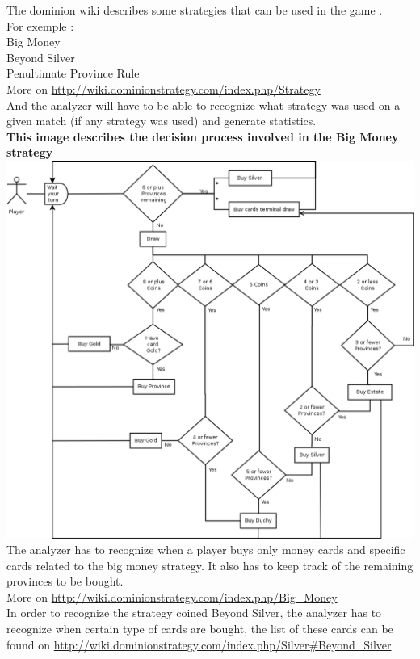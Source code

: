 \documentclass{scrreprt}
\begin{document}
The dominion wiki describes some strategies that can be used in the game .\\ For exemple :\\
Big Money\\
Beyond Silver \\
Penultimate Province Rule \\
More on \url{http://wiki.dominionstrategy.com/index.php/Strategy}\\

And the analyzer will have to be able to recognize what strategy was used on a
given match (if any strategy was used) and generate statistics.\\
\textbf{This image describes the decision process involved in the Big Money strategy}\\
\includegraphics[width=\textwidth,height=\textheight,keepaspectratio]{big-money}\\
The analyzer has to recognize when a player buys only money cards and specific cards related to the big money strategy. It also has to keep track of the remaining provinces to be bought.\\
More on \url{http://wiki.dominionstrategy.com/index.php/Big_Money}\\

In order to recognize the strategy coined Beyond Silver, the analyzer has to recognize when certain type of cards are bought, the list of these cards can be found on \url{http://wiki.dominionstrategy.com/index.php/Silver#Beyond_Silver}\\
\end{document}
